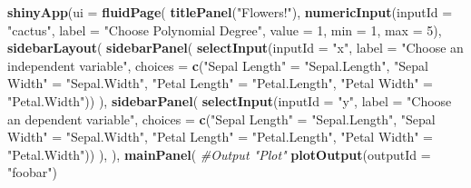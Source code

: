 \documentclass[]{article}
\newenvironment{Shaded}{\begin{snugshade}}{\end{snugshade}}
\newcommand{\CommentTok}[1]{\textcolor[rgb]{0.56,0.35,0.01}{\textit{#1}}}
\newcommand{\DataTypeTok}[1]{\textcolor[rgb]{0.13,0.29,0.53}{#1}}
\newcommand{\DecValTok}[1]{\textcolor[rgb]{0.00,0.00,0.81}{#1}}
\newcommand{\KeywordTok}[1]{\textcolor[rgb]{0.13,0.29,0.53}{\textbf{#1}}}
\newcommand{\NormalTok}[1]{#1}
\newcommand{\StringTok}[1]{\textcolor[rgb]{0.31,0.60,0.02}{#1}}
\begin{document}
\begin{Shaded}
\begin{Highlighting}[]
\KeywordTok{shinyApp}\NormalTok{(}\DataTypeTok{ui =} \KeywordTok{fluidPage}\NormalTok{(}
  \KeywordTok{titlePanel}\NormalTok{(}\StringTok{"Flowers!"}\NormalTok{),}
  \KeywordTok{numericInput}\NormalTok{(}\DataTypeTok{inputId =} \StringTok{"cactus"}\NormalTok{,}
                  \DataTypeTok{label =} \StringTok{"Choose Polynomial Degree"}\NormalTok{,}
                  \DataTypeTok{value =} \DecValTok{1}\NormalTok{, }\DataTypeTok{min =} \DecValTok{1}\NormalTok{, }\DataTypeTok{max =} \DecValTok{5}\NormalTok{),}
  \KeywordTok{sidebarLayout}\NormalTok{(}
    \KeywordTok{sidebarPanel}\NormalTok{(}
      \KeywordTok{selectInput}\NormalTok{(}\DataTypeTok{inputId =} \StringTok{"x"}\NormalTok{,}
                  \DataTypeTok{label =} \StringTok{"Choose an independent variable"}\NormalTok{,}
                  \DataTypeTok{choices =} \KeywordTok{c}\NormalTok{(}\StringTok{"Sepal Length"}\NormalTok{ =}\StringTok{ "Sepal.Length"}\NormalTok{,}
                              \StringTok{"Sepal Width"}\NormalTok{ =}\StringTok{ "Sepal.Width"}\NormalTok{,}
                              \StringTok{"Petal Length"}\NormalTok{ =}\StringTok{ "Petal.Length"}\NormalTok{,}
                              \StringTok{"Petal Width"}\NormalTok{ =}\StringTok{ "Petal.Width"}\NormalTok{))}
\NormalTok{    ),}
    \KeywordTok{sidebarPanel}\NormalTok{(}
      \KeywordTok{selectInput}\NormalTok{(}\DataTypeTok{inputId =} \StringTok{"y"}\NormalTok{,}
                  \DataTypeTok{label =} \StringTok{"Choose an dependent variable"}\NormalTok{,}
                  \DataTypeTok{choices =} \KeywordTok{c}\NormalTok{(}\StringTok{"Sepal Length"}\NormalTok{ =}\StringTok{ "Sepal.Length"}\NormalTok{,}
                              \StringTok{"Sepal Width"}\NormalTok{ =}\StringTok{ "Sepal.Width"}\NormalTok{,}
                              \StringTok{"Petal Length"}\NormalTok{ =}\StringTok{ "Petal.Length"}\NormalTok{,}
                              \StringTok{"Petal Width"}\NormalTok{ =}\StringTok{ "Petal.Width"}\NormalTok{))}
\NormalTok{    ),}
\NormalTok{  ),}
  \KeywordTok{mainPanel}\NormalTok{(}
    \CommentTok{#Output "Plot"}
    \KeywordTok{plotOutput}\NormalTok{(}\DataTypeTok{outputId =} \StringTok{"foobar"}\NormalTok{)}


\end{Highlighting}
\end{Shaded}
\end{document}
